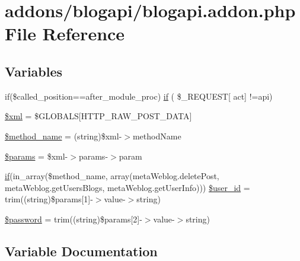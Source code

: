 \hypertarget{blogapi_8addon_8php}{}\section{addons/blogapi/blogapi.addon.\+php File Reference}
\label{blogapi_8addon_8php}
\subsection*{Variables}
\begin{DoxyCompactItemize}
\item 
if(\$called\+\_\+position==\textquotesingle{}after\+\_\+module\+\_\+proc\textquotesingle{}) \hyperlink{blogapi_8addon_8php_a836db554ec10171590637660c12ccd14}{if} ( \$\+\_\+\+R\+E\+Q\+U\+E\+ST\mbox{[} \textquotesingle{}act\textquotesingle{}\mbox{]} !=\textquotesingle{}api\textquotesingle{})
\item 
\hyperlink{blogapi_8addon_8php_aa108d9d91e700ac530401dd363b0723b}{\$xml} = \$G\+L\+O\+B\+A\+LS\mbox{[}\textquotesingle{}H\+T\+T\+P\+\_\+\+R\+A\+W\+\_\+\+P\+O\+S\+T\+\_\+\+D\+A\+TA\textquotesingle{}\mbox{]}
\item 
\hyperlink{blogapi_8addon_8php_a88c34f4701e451bbcef63e44e5902ebd}{\$method\+\_\+name} = (string)\$xml-\/$>$method\+Name
\item 
\hyperlink{blogapi_8addon_8php_afe68e6fbe7acfbffc0af0c84a1996466}{\$params} = \$xml-\/$>$params-\/$>$param
\item 
\hyperlink{config_8inc_8php_a73b98c0274e28635a594091f9ca43cb4}{if}(in\+\_\+array(\$method\+\_\+name, array(\textquotesingle{}meta\+Weblog.\+delete\+Post\textquotesingle{}, \textquotesingle{}meta\+Weblog.\+get\+Users\+Blogs\textquotesingle{}, \textquotesingle{}meta\+Weblog.\+get\+User\+Info\textquotesingle{}))) \hyperlink{blogapi_8addon_8php_ab94cd14ca14c41f3841c7a5ef01f75eb}{\$user\+\_\+id} = trim((string)\$params\mbox{[}1\mbox{]}-\/$>$value-\/$>$string)
\item 
\hyperlink{blogapi_8addon_8php_a607686ef9f99ea7c42f4f3dd3dbb2b0d}{\$password} = trim((string)\$params\mbox{[}2\mbox{]}-\/$>$value-\/$>$string)
\end{DoxyCompactItemize}


\subsection{Variable Documentation}
\mbox{\label{blogapi_8addon_8php_a88c34f4701e451bbcef63e44e5902ebd}} 
